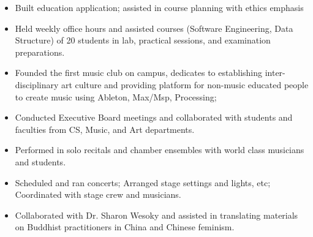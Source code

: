 \begin{itemize}
\item Built education application; assisted in course planning with ethics emphasis
\end{itemize}
\begin{itemize}
\item Held weekly office hours and assisted courses (Software Engineering, Data Structure) of 20 students in lab, practical sessions, and examination preparations.
\end{itemize}
\begin{itemize}
\item Founded the first music club on campus, dedicates to establishing inter-disciplinary art culture and providing platform for non-music educated people to create music using Ableton, Max/Msp, Processing; 
\item Conducted Executive Board meetings and collaborated with students and faculties from CS, Music, and Art departments.
\end{itemize}
\smallskip
{}
\begin{itemize}
\item Performed in solo recitals and chamber ensembles with world class musicians and students.
\item Scheduled and ran concerts; Arranged stage settings and lights, etc;
Coordinated with stage crew and musicians.
\end{itemize}
\smallskip
{}
\begin{itemize}
\item Collaborated with Dr. Sharon Wesoky and assisted in translating materials on Buddhist practitioners in China and Chinese feminism. 
\end{itemize}
\smallskip



